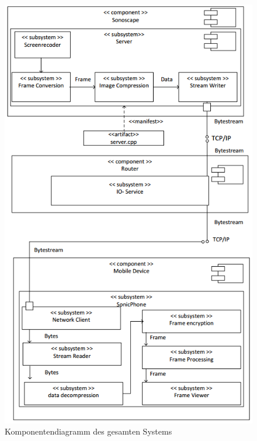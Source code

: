 \begin{figure}[H] 
\centering
\includegraphics[width=1\textwidth, height = 1\textheight]{Bilder/objektorientierteAnalyseundEntwurf/KD_Komponentendiagramm}
\caption{{\small Komponentendiagramm des gesamten Systems}}
\label{fig:Komponentendiagramm}
\end{figure}

